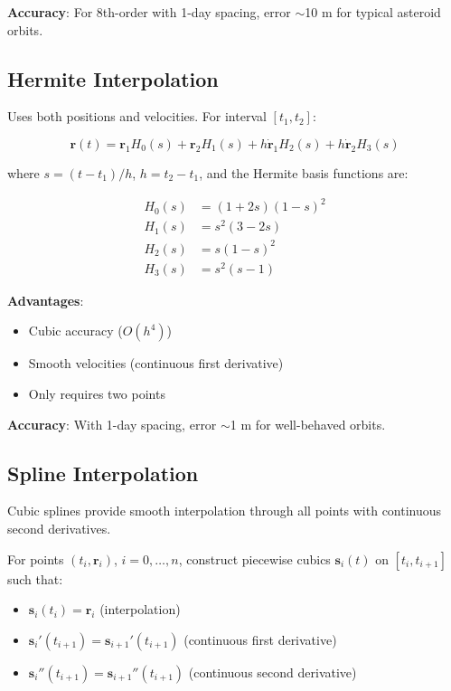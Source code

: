 \textbf{Accuracy}: For 8th-order with 1-day spacing, error $\sim$10 m for typical asteroid orbits.

\subsection{Hermite Interpolation}

Uses both positions and velocities. For interval $[t_1, t_2]$:

\begin{equation}
    \mathbf{r}(t) = \mathbf{r}_1 H_0(s) + \mathbf{r}_2 H_1(s) + h\dot{\mathbf{r}}_1 H_2(s) + h\dot{\mathbf{r}}_2 H_3(s)
\end{equation}

where $s = (t - t_1)/h$, $h = t_2 - t_1$, and the Hermite basis functions are:

\begin{align}
    H_0(s) &= (1 + 2s)(1-s)^2 \\
    H_1(s) &= s^2(3 - 2s) \\
    H_2(s) &= s(1-s)^2 \\
    H_3(s) &= s^2(s-1)
\end{align}

\textbf{Advantages}:
\begin{itemize}
    \item Cubic accuracy ($O(h^4)$)
    \item Smooth velocities (continuous first derivative)
    \item Only requires two points
\end{itemize}

\textbf{Accuracy}: With 1-day spacing, error $\sim$1 m for well-behaved orbits.

\subsection{Spline Interpolation}

Cubic splines provide smooth interpolation through all points with continuous second derivatives.

For points $(t_i, \mathbf{r}_i)$, $i = 0, \ldots, n$, construct piecewise cubics $\mathbf{s}_i(t)$ on $[t_i, t_{i+1}]$ such that:

\begin{itemize}
    \item $\mathbf{s}_i(t_i) = \mathbf{r}_i$ (interpolation)
    \item $\mathbf{s}_i'(t_{i+1}) = \mathbf{s}_{i+1}'(t_{i+1})$ (continuous first derivative)
    \item $\mathbf{s}_i''(t_{i+1}) = \mathbf{s}_{i+1}''(t_{i+1})$ (continuous second derivative)
\end{itemize}

